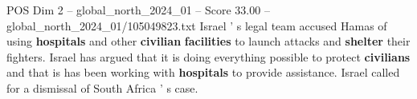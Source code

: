 \begin{textsample}{POS Dim 2 – global\_north\_2024\_01 – Score 33.00 – global\_north\_2024\_01/105049823.txt}
Israel ' s legal team accused Hamas of using \textbf{hospitals} and other \textbf{civilian} \textbf{facilities} to launch attacks and \textbf{shelter} their fighters.
Israel has argued that it is doing everything possible to protect \textbf{civilians} and that is has been working with \textbf{hospitals} to provide assistance.
Israel called for a dismissal of South Africa ' s case.

\end{textsample}
